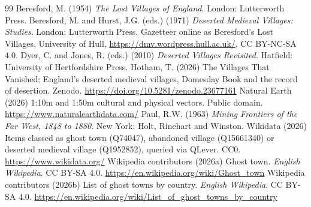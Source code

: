 \documentclass[11pt,a4paper]{article}
\begin{document}
\begin{thebibliography}{99}
 Beresford, M. (1954) \emph{The Lost Villages of England}. London: Lutterworth Press.
 Beresford, M. and Hurst, J.G. (eds.) (1971) \emph{Deserted Medieval Villages: Studies}. London: Lutterworth Press. Gazetteer online as Beresford's Lost Villages, University of Hull, \url{https://dmv.wordpress.hull.ac.uk/}, CC BY-NC-SA 4.0.
 Dyer, C. and Jones, R. (eds.) (2010) \emph{Deserted Villages Revisited}. Hatfield: University of Hertfordshire Press.
 Hotham, T. (2026) The Villages That Vanished: England's deserted medieval villages, Domesday Book and the record of desertion. Zenodo. \url{https://doi.org/10.5281/zenodo.23677161}
 Natural Earth (2026) 1:10m and 1:50m cultural and physical vectors. Public domain. \url{https://www.naturalearthdata.com/}
 Paul, R.W. (1963) \emph{Mining Frontiers of the Far West, 1848 to 1880}. New York: Holt, Rinehart and Winston.
 Wikidata (2026) Items classed as ghost town (Q74047), abandoned village (Q15661340) or deserted medieval village (Q1952852), queried via QLever. CC0. \url{https://www.wikidata.org/}
 Wikipedia contributors (2026a) Ghost town. \emph{English Wikipedia}. CC BY-SA 4.0. \url{https://en.wikipedia.org/wiki/Ghost_town}
 Wikipedia contributors (2026b) List of ghost towns by country. \emph{English Wikipedia}. CC BY-SA 4.0. \url{https://en.wikipedia.org/wiki/List_of_ghost_towns_by_country}
\end{thebibliography}
\end{document}
